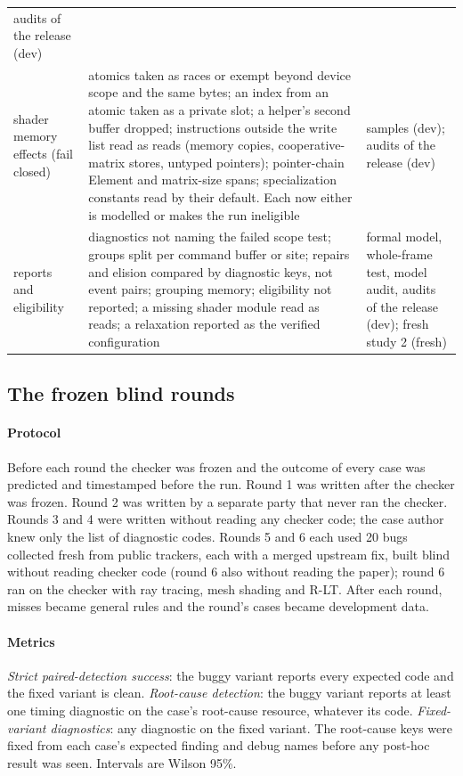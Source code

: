\documentclass[acmtog,anonymous,review]{acmart}
\begin{document}
\begin{table}[t]
\begin{tabular}{@{}p{}p{}p{}@{}}
audits of the release (dev) \\
shader memory effects (fail closed) & atomics taken as races or exempt beyond device scope and the same bytes; an index
from an atomic taken as a private slot; a helper's second buffer dropped; instructions outside the write list read as
reads (memory copies, cooperative-matrix stores, untyped pointers); pointer-chain Element and matrix-size spans;
specialization constants read by their default. Each now either is modelled or makes the run ineligible &
samples (dev); audits of the release (dev) \\
reports and eligibility & diagnostics not naming the failed scope test; groups split per command buffer or site;
repairs and elision compared by diagnostic keys, not event pairs; grouping memory; eligibility not reported; a missing
shader module read as reads; a relaxation reported as the verified configuration & formal model, whole-frame test,
model audit, audits of the release (dev); fresh study 2 (fresh) \\
\bottomrule
\end{tabular}
\end{table}

\subsection{The frozen blind rounds}
\label{sup:rounds}
\paragraph{Protocol}
Before each round the checker was frozen and the outcome of every case was predicted and timestamped before the run.
Round 1 was written after the checker was frozen. Round 2 was written by a separate party that never ran the checker.
Rounds 3 and 4 were written without reading any checker code; the case author knew only the list of diagnostic codes.
Rounds 5 and 6 each used 20 bugs collected fresh from public trackers, each with a merged upstream fix, built blind
without reading checker code (round 6 also without reading the paper); round 6 ran on the checker with ray tracing,
mesh shading and R-LT. After each round, misses became general rules and the round's cases became development data.

\paragraph{Metrics}
\emph{Strict paired-detection success}: the buggy variant reports every expected code and the fixed variant is clean.
\emph{Root-cause detection}: the buggy variant reports at least one timing diagnostic on the case's root-cause resource,
whatever its code. \emph{Fixed-variant diagnostics}: any diagnostic on the fixed variant. The root-cause keys were fixed
from each case's expected finding and debug names before any post-hoc result was seen. Intervals are Wilson 95\%.
\end{document}
